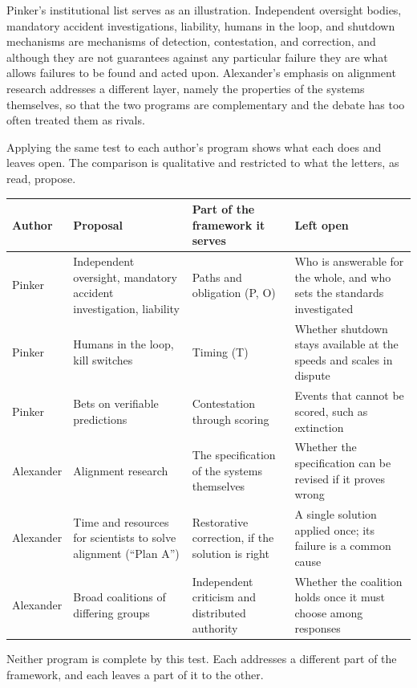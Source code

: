 \documentclass[11pt]{article}
\begin{document}
Pinker's institutional list serves as an illustration. Independent oversight bodies, mandatory accident investigations, liability, humans in the loop, and shutdown mechanisms are mechanisms of detection, contestation, and correction, and although they are not guarantees against any particular failure they are what allows failures to be found and acted upon. Alexander's emphasis on alignment research addresses a different layer, namely the properties of the systems themselves, so that the two programs are complementary and the debate has too often treated them as rivals.

Applying the same test to each author's program shows what each does and leaves open. The comparison is qualitative and restricted to what the letters, as read, propose.

\begin{center}
\small
\begin{tabular}{@{}p{}p{}p{}p{}@{}}
\toprule
\textbf{Author} & \textbf{Proposal} & \textbf{Part of the framework it serves} & \textbf{Left open}\\
\midrule
Pinker & Independent oversight, mandatory accident investigation, liability & Paths and obligation (P, O) & Who is answerable for the whole, and who sets the standards investigated\\[0.5em]
Pinker & Humans in the loop, kill switches & Timing (T) & Whether shutdown stays available at the speeds and scales in dispute\\[0.5em]
Pinker & Bets on verifiable predictions & Contestation through scoring & Events that cannot be scored, such as extinction\\[0.5em]
Alexander & Alignment research & The specification of the systems themselves & Whether the specification can be revised if it proves wrong\\[0.5em]
Alexander & Time and resources for scientists to solve alignment (``Plan A'') & Restorative correction, if the solution is right & A single solution applied once; its failure is a common cause\\[0.5em]
Alexander & Broad coalitions of differing groups & Independent criticism and distributed authority & Whether the coalition holds once it must choose among responses\\
\bottomrule
\end{tabular}
\end{center}

Neither program is complete by this test. Each addresses a different part of the framework, and each leaves a part of it to the other.
\end{document}
